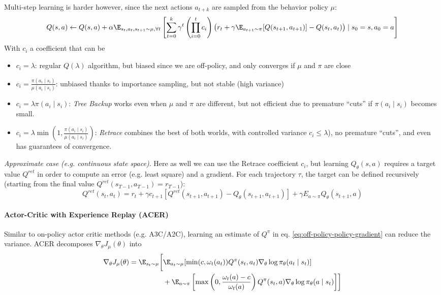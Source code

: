 Multi-step learning is harder however, since the next actions $a_{t+k}$ are sampled from the behavior policy $\mu$:
\[
Q(s, a) \leftarrow Q(s, a) + \alpha \E_{s_t,a_t,s_{t+1} \sim \mu, \forall t} \left[ 
    \sum_{t=0}^k \gamma^t \left( \prod_{i=0}^t c_i \right) \left( 
        r_t + \gamma \E_{a_{t+1}\sim \pi} [Q(s_{t+1}, a_{t+1})] - Q(s_t,a_t)
    \right) \mid s_0 = s, a_0 = a
\right]
\]
With $c_i$ a coefficient that can be
\begin{itemize}
    \item $c_i = \lambda$: regular $Q(\lambda)$ algorithm, but biased since we are off-policy, and only converges if $\mu$ and $\pi$ are close
    \item $c_i = \frac{\pi(a_i\mid s_i)}{\mu(a_i\mid s_i)}$: unbiased thanks to importance sampling, but not stable (high variance)
    \item $c_i = \lambda \pi(a_i\mid s_i)$: \emph{Tree Backup} \cite{precup2000eligibility} works even when $\mu$ and $\pi$ are different, but not efficient due to premature “cuts” if $\pi(a_i\mid s_i)$ becomes small.
    \item $c_i = \lambda \min(1, \frac{\pi(a_i\mid s_i)}{\mu(a_i\mid s_i)})$: \emph{Retrace} \cite{munos2016safe} combines the best of both worlds, with controlled variance $c_i \leq \lambda$), no premature “cuts”, and even has guarantees of convergence.
\end{itemize}

\emph{Approximate case (e.g. continuous state space)}.
Here as well we can use the Retrace coefficient $c_i$, but learning $Q_\theta(s,a)$ requires a target value $Q^{ret}$ in order to compute an error (e.g. least square) and a gradient. For each trajectory $\tau$, the target can be defined recursively (starting from the final value $Q^{ret}(s_{T-1}, a_{T-1}) = r_{T-1}$):
\[
Q^{ret}(s_t, a_t) = r_t + \gamma c_{t+1} [Q^{ret}(s_{t+1}, a_{t+1}) - Q_\theta(s_{t+1}, a_{t+1})] + \gamma E_{a\sim \pi} Q_\theta(s_{t+1}, a)
\]

\paragraph{Actor-Critic with Experience Replay (ACER)} \cite{wang2016sample}
Similar to on-policy actor critic methods (e.g. A3C/A2C), learning an estimate of $Q^\pi$ in eq. \ref{eq:off-policy-policy-gradient} can reduce the variance. ACER decomposes $\nabla_\theta J_\mu(\theta)$ into
\begin{align*}
\nabla_\theta J_\mu(\theta) = \E_{s_t\sim \mu} \biggl[
    & \E_{a_t\sim \mu}[
        \min(c, \omega_t(a_t)) Q^\pi(s_t, a_t) \nabla_\theta \log \pi_\theta(a_t\mid s_t)
    ] \\
    & + \E_{a\sim \pi}\left[
        \max\left(0, \frac{\omega_t(a)-c}{\omega_t(a)}\right) Q^\pi(s_t, a) \nabla_\theta \log \pi_\theta(a\mid s_t)
    \right]
\biggr]
\end{align*}

